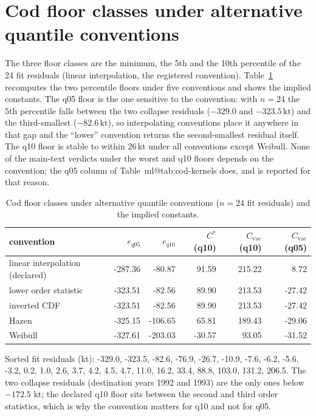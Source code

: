 \documentclass[11pt,a4paper]{article}
\makeatletter
\newcommand{\kt}{\,\mathrm{kt}}
\newcommand{\mref}[1]{\csname ml@#1\endcsname}
\makeatother
\begin{document}
\endgroup


\section{Cod floor classes under alternative quantile conventions}\label{si:quantiles}
The three floor classes are the minimum, the 5th and the 10th percentile of the 24 fit residuals (linear interpolation, the registered convention). Table~\ref{tab:si-quantiles} recomputes the two percentile floors under five conventions and shows the implied constants. The q05 floor is the one sensitive to the convention: with $n=24$ the 5th percentile falls between the two collapse residuals ($-329.0$ and $-323.5\kt$) and the third-smallest ($-82.6\kt$), so interpolating conventions place it anywhere in that gap and the ``lower'' convention returns the second-smallest residual itself. The q10 floor is stable to within $26\kt$ under all conventions except Weibull. None of the main-text verdicts under the worst and q10 floors depends on the convention; the q05 column of Table~\mref{tab:cod-kernels} does, and is reported for that reason.
\begin{table}[H]
\centering
\caption{Cod floor classes under alternative quantile conventions ($n=24$ fit residuals) and the implied constants.}
\label{tab:si-quantiles}
\small
\begin{tabular}{lrrrrr}
\toprule
convention & $e_{q05}$ & $e_{q10}$ & $C^*$ (q10) & $C_{\mathrm{vac}}$ (q10) & $C_{\mathrm{vac}}$ (q05) \\
\midrule
linear interpolation (declared) & -287.36 & -80.87 & 91.59 & 215.22 & 8.72 \\
lower order statistic & -323.51 & -82.56 & 89.90 & 213.53 & -27.42 \\
inverted CDF & -323.51 & -82.56 & 89.90 & 213.53 & -27.42 \\
Hazen & -325.15 & -106.65 & 65.81 & 189.43 & -29.06 \\
Weibull & -327.61 & -203.03 & -30.57 & 93.05 & -31.52 \\
\bottomrule
\end{tabular}
\par\smallskip\begin{minipage}{0.97\linewidth}\footnotesize Sorted fit residuals (kt): -329.0, -323.5, -82.6, -76.9, -26.7, -10.9, -7.6, -6.2, -5.6, -3.2, 0.2, 1.0, 2.6, 3.7, 4.2, 4.5, 4.7, 11.0, 16.2, 33.4, 88.8, 103.0, 131.2, 206.5. The two collapse residuals (destination years 1992 and 1993) are the only ones below $-172.5$ kt; the declared q10 floor sits between the second and third order statistics, which is why the convention matters for q10 and not for q05.\end{minipage}
\end{table}
\end{document}
